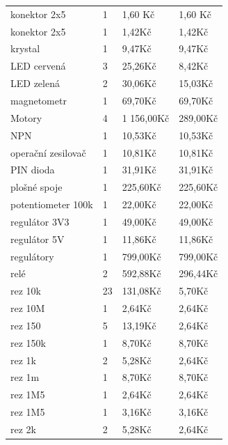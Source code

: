 \documentclass[a4paper]{report}
\begin{document}
\begin{longtable}{L{6cm}L{3cm}L{3cm}L{3cm}}
konektor 2x5            & 1         & 1,60 Kč    & 1,60 Kč     \\
konektor 2x5            & 1         & 1,42Kč     & 1,42Kč      \\
krystal                 & 1         & 9,47Kč     & 9,47Kč      \\
LED cervená             & 3         & 25,26Kč    & 8,42Kč      \\
LED zelená              & 2         & 30,06Kč    & 15,03Kč     \\
magnetometr             & 1         & 69,70Kč    & 69,70Kč     \\
Motory                  & 4         & 1 156,00Kč & 289,00Kč    \\
NPN                     & 1         & 10,53Kč    & 10,53Kč     \\
operační zesilovač      & 1         & 10,81Kč    & 10,81Kč     \\
PIN dioda               & 1         & 31,91Kč    & 31,91Kč     \\
plošné spoje            & 1         & 225,60Kč   & 225,60Kč    \\
potentiometer 100k      & 1         & 22,00Kč    & 22,00Kč     \\
regulátor 3V3           & 1         & 49,00Kč    & 49,00Kč     \\
regulátor 5V            & 1         & 11,86Kč    & 11,86Kč     \\
regulátory              & 1         & 799,00Kč   & 799,00Kč    \\
relé                    & 2         & 592,88Kč   & 296,44Kč    \\
rez 10k                 & 23        & 131,08Kč   & 5,70Kč      \\
rez 10M                 & 1         & 2,64Kč     & 2,64Kč      \\
rez 150                 & 5         & 13,19Kč    & 2,64Kč      \\
rez 150k                & 1         & 8,70Kč     & 8,70Kč      \\
rez 1k                  & 2         & 5,28Kč     & 2,64Kč      \\
rez 1m                  & 1         & 8,70Kč     & 8,70Kč      \\
rez 1M5                 & 1         & 2,64Kč     & 2,64Kč      \\
rez 1M5                 & 1         & 3,16Kč     & 3,16Kč      \\
rez 2k                  & 2         & 5,28Kč     & 2,64Kč      \\

\end{longtable}
\end{document}
